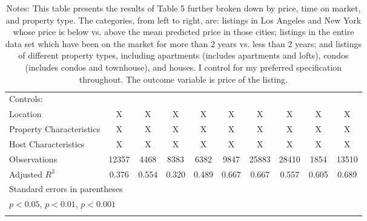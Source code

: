 \begin{landscape}
{\begin{longtable}{l*{9}{c}}
\hline
Controls:        \\
\hspace{3mm} Location  &                           X      & X & X & X & X & X &  X & X & X\\
\hspace{3mm} Property Characteristics  &   X  & X & X & X & X & X &  X & X & X\\
\hspace{3mm} Host Characteristics  &         X& X & X & X & X & X &  X & X & X\\
\hline
Observations        &       12357         &        4468         &        8383         &        6382         &        9847         &       25883         &       28410         &        1854         &       13510         \\
Adjusted \(R^{2}\)  &       0.376         &       0.554         &       0.320         &       0.489         &       0.667         &       0.667         &       0.557         &       0.605         &       0.689         \\
\hline\hline
\multicolumn{10}{l}{\footnotesize Standard errors in parentheses}\\
\multicolumn{10}{l}{\footnotesize \sym{*} \(p<0.05\), \sym{**} \(p<0.01\), \sym{***} \(p<0.001\)}\\
\caption*{Notes: This table presents the results of Table 5 further broken down by price, time on market, and property type. The categories, from left to right, are: listings in Los Angeles and New York whose price is below vs. above the mean predicted price in those cities; listings in the entire data set which have been on the market for more than 2 years vs. less than 2 years; and listings of different property types, including apartments (includes apartments and lofts), condos (includes condos and townhouse), and houses. I control for my preferred specification throughout. The outcome variable is price of the listing.}\\
\end{longtable}
}

\end{landscape}

